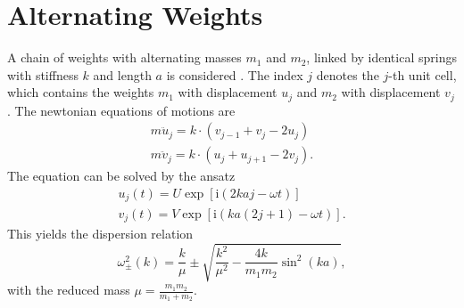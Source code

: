 \section{Alternating Weights}
A chain of weights with alternating masses $m_1$ and $m_2$, linked by identical springs with stiffness $k$ and length $a$ is considered .
The index $j$ denotes the $j$-th unit cell, which contains the weights $m_1$ with displacement $u_j$ and $m_2$ with displacement $v_j$.
The newtonian equations of motions are
\begin{gather*}
	m \ddot u_j = k \cdot \left(v_{j - 1} + v_{j} - 2 u_j \right)\\
	m \ddot v_j = k \cdot \left(u_{j} + u_{j + 1} - 2 v_j \right).
\end{gather*}
The equation can be solved by the ansatz
\begin{gather*}
	u_j(t) = U \exp\left[\text{i} \left(2 k a j - \omega t\right)\right]\\
	v_j(t) = V \exp\left[\text{i} \left(k a (2 j + 1) - \omega t\right)\right].
\end{gather*}
This yields the dispersion relation
\begin{equation}
	\omega_\pm^2(k) = \frac{k}{\mu} \pm \sqrt{\frac{k^2}{\mu^2} - \frac{4k}{m_1 m_2}\sin^2\left(k a\right)},
\end{equation}
with the reduced mass $\mu = \frac{m_1 m_2}{m_1 + m_2}$.
